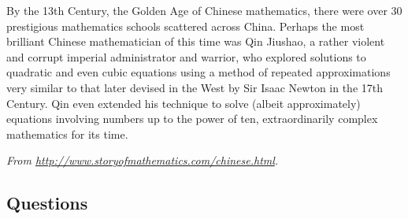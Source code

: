 By the 13th Century, the Golden Age of Chinese mathematics, there were over 30 prestigious mathematics schools scattered across China. Perhaps the most brilliant Chinese mathematician of this time was Qin Jiushao, a rather violent and corrupt imperial administrator and warrior, who explored solutions to quadratic and even cubic equations using a method of repeated approximations very similar to that later devised in the West by Sir Isaac Newton in the 17th Century. Qin even extended his technique to solve (albeit approximately) equations involving numbers up to the power of ten, extraordinarily complex mathematics for its time.

\textit{From \url{http://www.storyofmathematics.com/chinese.html}.}
\clearpage
\subsection*{Questions}
